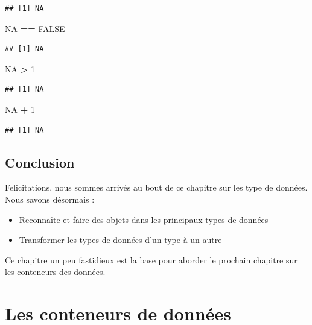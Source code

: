\documentclass[]{book}
\newenvironment{Shaded}{\begin{snugshade}}{\end{snugshade}}
\newcommand{\DecValTok}[1]{\textcolor[rgb]{0.00,0.00,0.81}{#1}}
\newcommand{\StringTok}[1]{\textcolor[rgb]{0.31,0.60,0.02}{#1}}
\newcommand{\OtherTok}[1]{\textcolor[rgb]{0.56,0.35,0.01}{#1}}
\newcommand{\OperatorTok}[1]{\textcolor[rgb]{0.81,0.36,0.00}{\textbf{#1}}}
\providecommand{\tightlist}{%
  \setlength{\itemsep}{0pt}\setlength{\parskip}{0pt}}
\begin{document}
\begin{verbatim}
## [1] NA
\end{verbatim}

\begin{Shaded}
\begin{Highlighting}[]
\OtherTok{NA} \OperatorTok{==}\StringTok{ }\OtherTok{FALSE}
\end{Highlighting}
\end{Shaded}

\begin{verbatim}
## [1] NA
\end{verbatim}

\begin{Shaded}
\begin{Highlighting}[]
\OtherTok{NA} \OperatorTok{>}\StringTok{ }\DecValTok{1}
\end{Highlighting}
\end{Shaded}

\begin{verbatim}
## [1] NA
\end{verbatim}

\begin{Shaded}
\begin{Highlighting}[]
\OtherTok{NA} \OperatorTok{+}\StringTok{ }\DecValTok{1}
\end{Highlighting}
\end{Shaded}

\begin{verbatim}
## [1] NA
\end{verbatim}

\section{Conclusion}\label{conclusion-1}

Felicitations, nous sommes arrivés au bout de ce chapitre sur les type
de données. Nous savons désormais :

\begin{itemize}
\tightlist
\item
  Reconnaîte et faire des objets dans les principaux types de données
\item
  Transformer les types de données d'un type à un autre
\end{itemize}

Ce chapitre un peu fastidieux est la base pour aborder le prochain
chapitre sur les conteneurs des données.

\chapter{Les conteneurs de données}\label{dataType2}
\end{document}
